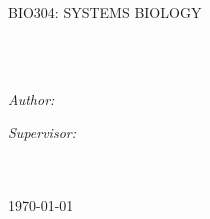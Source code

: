 \documentclass[
12pt, %
oneside, %
english, %
doublespacing, %
nolistspacing, %
liststotoc, %
toctotoc, %
parskip, %
headsepline, %
chapterinoneline, %
consistentlayout, %
]{MastersDoctoralThesis} %
\author{Siyuan \textsc{Guo} 11611118 } %
\begin{document}
\frontmatter %

\pagestyle{plain} %




\begin{titlepage}
\begin{center}

\vspace*{.06\textheight}
{\scshape \LARGE \univname \par}\vspace{1.0cm} %
\textsc{\Large BIO304: SYSTEMS BIOLOGY}\\[0.5cm] %

\HRule \\[0.56cm] %
{\huge \bfseries \ttitle \par}\vspace{0.5cm} %
\HRule \\[0.8cm] %
 
\begin{minipage}[t]{0.4\textwidth}
\begin{flushleft} \large
\emph{Author:}\\
\href{http://www.johnsmith.com}{\authorname} %
\end{flushleft}
\end{minipage}
\begin{minipage}[t]{0.4\textwidth}
\begin{flushright} \large
\emph{Supervisor:} \\
\href{http://www.jamessmith.com}{\supname} %
\end{flushright}
\end{minipage}\\[5cm]

\Large \deptname\\[0cm] %
 
{\large \today}\\[0cm] %
 
\end{center}
\end{titlepage}
\end{document}
